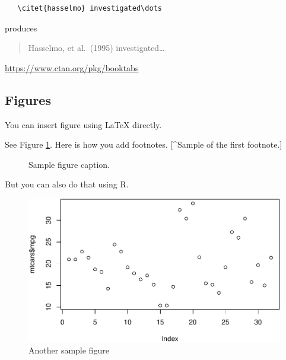 \documentclass{article}
\newenvironment{Shaded}{\begin{snugshade}}{\end{snugshade}}
\newcommand{\FunctionTok}[1]{\textcolor[rgb]{0.00,0.00,0.00}{#1}}
\newcommand{\NormalTok}[1]{#1}
\newcommand{\SpecialCharTok}[1]{\textcolor[rgb]{0.00,0.00,0.00}{#1}}
\begin{document}
\begin{verbatim}
   \citet{hasselmo} investigated\dots
\end{verbatim}

produces

\begin{quote}
  Hasselmo, et al.\ (1995) investigated\dots
\end{quote}

\begin{center}
  \url{https://www.ctan.org/pkg/booktabs}
\end{center}

\hypertarget{figures}{%
\subsection{Figures}\label{figures}}

You can insert figure using LaTeX directly.

See Figure \ref{fig:fig1}. Here is how you add footnotes. {[}\^{}Sample
of the first footnote.{]}

\begin{figure}
  \centering
  \fbox{\rule[-.5cm]{4cm}{4cm} \rule[-.5cm]{4cm}{0cm}}
  \caption{Sample figure caption.}
  \label{fig:fig1}
\end{figure}

But you can also do that using R.

\begin{Shaded}
\end{Shaded}

\begin{figure}
\centering
\includegraphics{report_files/figure-latex/fig2-1.pdf}
\caption{Another sample figure}
\end{figure}
\end{document}
